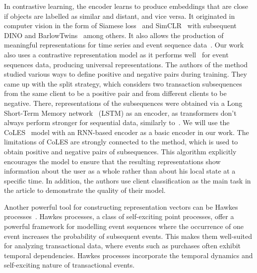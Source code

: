 In contrastive learning, the encoder learns to produce embeddings that are close if objects are labelled as similar and distant, and vice versa. 
It originated in computer vision in the form of Siamese loss~\cite{hoffer2015deep} and SimCLR~\cite{chen2020simple} with subsequent DINO \cite{caron2021emerging} and BarlowTwins~\cite{zbontar2021barlow} among others.
It also allows the production of meaningful representations for time series and event sequence data~\cite{zhang2024self}.
Our work also uses a contrastive representation model as it performs well~\cite{babaev2022coles} for event sequences data, producing universal representations. 
The authors of the method studied various ways to define positive and negative pairs during training. 
They came up with the split strategy, which considers two transaction subsequences from the same client to be a positive pair and from different clients to be negative. 
There, representations of the subsequences were obtained via a Long Short-Term Memory network~\cite{hochreiter1997long} (LSTM) as an encoder, as transformers don't always perform stronger for sequential data, similarly to~\cite{yue2022ts2vec}. We will use the CoLES~\cite{babaev2022coles} model with an RNN-based encoder as a basic encoder in our work. The limitations of CoLES are strongly connected to the method, which is used to obtain positive and negative pairs of subsequences. This algorithm explicitly encourages the model to ensure that the resulting representations show information about the user as a whole rather than about his local state at a specific time.
In addition, the authors use client classification as the main task in the article to demonstrate the quality of their model.

Another powerful tool for constructing representation vectors can be Hawkes processes~\cite{hawkes1971spectra, zhang2020self, hawkes1971spectra, hawkes2018hawkes,  hawkes2016de}. Hawkes processes, a class of self-exciting point processes, offer a powerful framework for modelling event sequences where the occurrence of one event increases the probability of subsequent events. This makes them well-suited for analyzing transactional data, where events such as purchases often exhibit temporal dependencies. Hawkes processes incorporate the temporal dynamics and self-exciting nature of transactional events.

